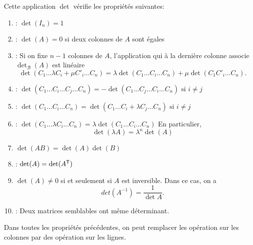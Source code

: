 \documentclass{book}
\begin{document}
\begin{Proposition}[Propriétés]
Cette application $\det$ vérifie  les propriétés suivantes:
\begin{enumerate}
\item {} : $\det(I_n) = 1$
\item
   : $\det(A) = 0$ si deux colonnes de $A$ sont égales
\item {} :
  Si on fixe $n-1$ colonnes de $A$, l'application qui à la dernière colonne associe $\det_\mathcal{B}(A)$ est linéaire
  $$\det (C_1 \dots  \lambda C_i+ \mu C'_i \dots C_n) = \lambda \det(C_1 \dots C_i \dots C_n) + \mu  \det(C_1  C'_i \dots C_n).$$
\item {} : 
  $\det(C_1 \dots C_i \dots C_j  \dots C_n) = -\det(C_1 \dots C_j \dots C_i  \dots C_n)\text{ si }i\neq j$
\item {} :
  $\det(C_1 \dots C_i  \dots C_n) =\det(C_1 \dots C_i+\lambda C_j  \dots C_n)\text{ si }i\neq j$
\item {} :
  $\det(C_1 \dots \lambda C_i  \dots C_n) =\lambda\det(C_1 \dots C_i  \dots C_n)$
  En particulier,
  $$\det(\lambda A) =\lambda^n\det(A)$$
  \item  {} $\det (AB) = \det (A)\det(B)$
\item  {} : $\mathop{\mathrm{det}}\nolimits (A) = \mathop{\mathrm{det}}\nolimits (A^{\mathsf {T}})$
\item  {}  $\det(A) \neq 0$ si et seulement si $A$ est inversible. Dans ce cas, on a 
$$ det(A^{-1})=\frac {1}{\det A}.$$
\item  {} : Deux matrices semblables ont même déterminant.
\end{enumerate}
Dans toutes les propriétés précédentes, on peut remplacer les opération sur les colonnes par des opération sur les lignes.
\end{Proposition}
\end{document}
